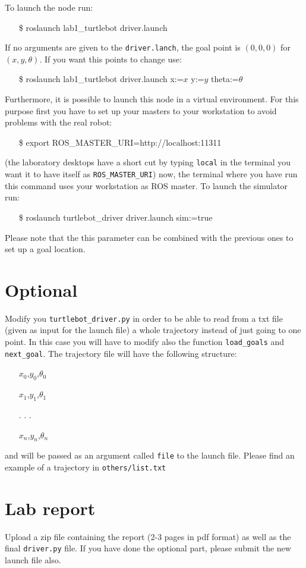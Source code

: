 \documentclass[a4paper,10pt]{article}
\begin{document}
To launch the node run:
\begin{shaded}
	\begin{itemize}
		\item[\$] roslaunch lab1\_turtlebot driver.launch
	\end{itemize}
\end{shaded}
If no arguments are given to the \texttt{driver.lanch}, the goal point is $(0,0,0)$ for $(x,y,\theta)$. If you want this points to change use:
\begin{shaded}
	\begin{itemize}
		\item[\$] roslaunch lab1\_turtlebot driver.launch x:=$x$ y:=$y$ theta:=$\theta$
	\end{itemize}
\end{shaded}
Furthermore, it is possible to launch this node in a virtual environment. For this purpose first you have to set up your masters to your workstation to avoid problems with the real robot:
\begin{shaded}
	\begin{itemize}
		\item[\$] export ROS\_MASTER\_URI=http://localhost:11311
	\end{itemize}
\end{shaded}
(the laboratory desktops have a short cut by typing \texttt{local} in the terminal you want it to have itself as \texttt{ROS\_MASTER\_URI}) now, the terminal where you have run this command uses your workstation as ROS master. To launch the simulator run:
\begin{shaded}
	\begin{itemize}
		\item[\$] roslaunch turtlebot\_driver driver.launch sim:=true
	\end{itemize}
\end{shaded}
Please note that the this parameter can be combined with the previous ones to set up a goal location.


\section{Optional}

Modify you \texttt{turtlebot\_driver.py} in order to be able to read from a txt file (given as input for the launch file) a whole trajectory instead of just going to one point. In this case you will have to modify also the function \texttt{load\_goals} and \texttt{next\_goal}. The trajectory file will have the following structure:
\begin{shaded}
	\begin{itemize}
		\item[] $x_0$,$y_0$,$\theta_0$
		\item[] $x_1$,$y_1$,$\theta_1$
		\item[] . . .
		\item[] $x_n$,$y_n$,$\theta_n$
	\end{itemize}
\end{shaded}
and will be passed as an argument called \texttt{file} to the launch file. Please find an example of a trajectory in \texttt{others/list.txt}

\section{Lab report}

Upload a zip file containing the report (2-3 pages in pdf format) as well as the final \texttt{driver.py} file. If you have done the optional part, please submit the new launch file also.
\end{document}
